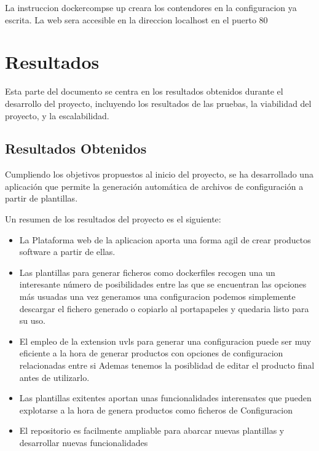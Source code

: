 \documentclass[12pt, a4paper, twoside]{article}
\begin{document}
La instruccion dockercompse up creara los contendores en la configuracion ya escrita. La web sera accesible en la direccion localhost en el puerto 80





\section{Resultados}
\label{sec:Resultados}
Esta parte del documento se centra en los resultados obtenidos durante el desarrollo del proyecto, incluyendo los resultados de las pruebas, la viabilidad del proyecto, y la escalabilidad.
\subsection{Resultados Obtenidos}
Cumpliendo los objetivos propuestos al inicio del proyecto, se ha desarrollado una aplicación que permite la generación automática de archivos de configuración a partir de plantillas.

Un resumen de los resultados del proyecto es el siguiente:

\begin{itemize}
\item La Plataforma web de la aplicacion aporta una forma agil de crear productos software a partir de ellas.

\item Las plantillas para generar ficheros como dockerfiles recogen una un interesante número de posibilidades entre las que se encuentran las opciones más usuadas
una vez generamos una configuracion podemos simplemente descargar el fichero generado o copiarlo al portapapeles y quedaria listo para su uso.

\item El empleo de la extension uvls para generar una configuracion puede ser muy eficiente a la hora de generar productos con opciones de configuracion relacionadas entre si
Ademas tenemos la posiblidad de editar el producto final antes de utilizarlo.

\item Las plantillas exitentes aportan unas funcionalidades interensates que pueden explotarse a la hora de genera productos como ficheros de Configuracion

\item El repositorio es facilmente ampliable para abarcar nuevas plantillas y desarrollar nuevas funcionalidades
\end{itemize}
\end{document}
